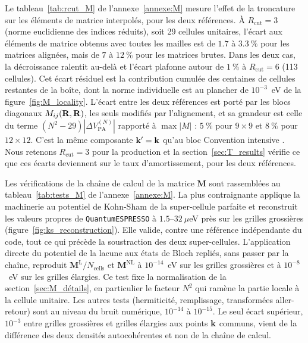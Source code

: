 Le tableau~\ref{tab:rcut_M} de l'annexe~\ref{annexe:M} mesure l'effet de la troncature sur les éléments de matrice interpolés, pour les deux références. À $R_\text{cut} =3$ (norme euclidienne des indices réduits), soit 29 cellules unitaires, l'écart aux éléments de matrice obtenus avec toutes les mailles est de $1.7$ à $3.3~\%$ pour les matrices alignées, mais de $7$ à $12~\%$ pour les matrices brutes. Dans les deux cas, la décroissance ralentit au-delà et l'écart plafonne autour de $1~\%$ à $R_\text{cut}=6$ (113 cellules). Cet écart résiduel est la contribution cumulée des centaines de cellules restantes de la boîte, dont la norme individuelle est au plancher de $10^{-3}$~eV de la figure~\ref{fig:M_locality}. L'écart entre les deux références est porté par les blocs diagonaux $M_{ij}(\mathbf{R},\mathbf{R})$, les seuls modifiés par l'alignement, et sa grandeur est celle du terme $(N^2-29)|\Delta V_\text{PA}^{(N)}|$ rapporté à $\max|M|$ : $5~\%$ pour $9\times 9$ et $8~\%$ pour $12\times 12$. C'est la même composante $\mathbf{k}'=\mathbf{k}$ qu'au bloc \og Convention intensive \fg{}. Nous retenons $R_\text{cut}=3$ pour la production et la section~\ref{sec:T_results} vérifie ce que ces écarts deviennent sur le taux d'amortissement, pour les deux références.

\bigskip
{}

Les vérifications de la chaîne de calcul de la matrice $\bm M$ sont rassemblées au tableau~\ref{tab:tests_M} de l'annexe~\ref{annexe:M}. La plus contraignante applique la machinerie au potentiel de Kohn-Sham de la super-cellule parfaite et reconstruit les valeurs propres de \texttt{QuantumESPRESSO} à $1.5$--$32~\mu$eV près sur les grilles grossières (figure~\ref{fig:ks_reconstruction}). Elle valide, contre une référence indépendante du code, tout ce qui précède la soustraction des deux super-cellules. L'application directe du potentiel de la lacune aux états de Bloch repliés, sans passer par la chaîne, reproduit $\bm M^\text{L}/N_\text{cells}$ et $\bm M^\text{NL}$ à $10^{-14}$~eV sur les grilles grossières et à $10^{-8}$~eV sur les grilles élargies. Ce test fixe la normalisation de la section~\ref{sec:M_détails}, en particulier le facteur $N^2$ qui ramène la partie locale à la cellule unitaire. Les autres tests (hermiticité, remplissage, transformées aller-retour) sont au niveau du bruit numérique, $10^{-14}$ à $10^{-15}$. Le seul écart supérieur, $10^{-3}$ entre grilles grossières et grilles élargies aux points $\mathbf{k}$ communs, vient de la différence des deux densités autocohérentes et non de la chaîne de calcul.

